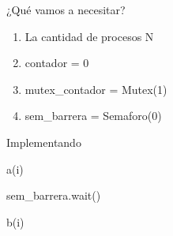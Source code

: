 \documentclass[pdf]{beamer}
\begin{document}
\begin{frame}{¿Qué vamos a necesitar?}
    \begin{enumerate}
        \item La cantidad de procesos N 
        \item contador = 0
        \item mutex\_contador = Mutex(1)
        \item sem\_barrera = Semaforo(0)
    \end{enumerate}
\end{frame}

\begin{frame}{Implementando}
    \begin{algorithmic}
            \State a(i)
            
            \vspace{1em}
            
            \vspace{1em}
            
            \State sem\_barrera.wait()
            
            \vspace{1em}
            
            \State b(i)
            
        \EndFunction
        
        
    \end{algorithmic}
    

\end{frame}
\end{document}
